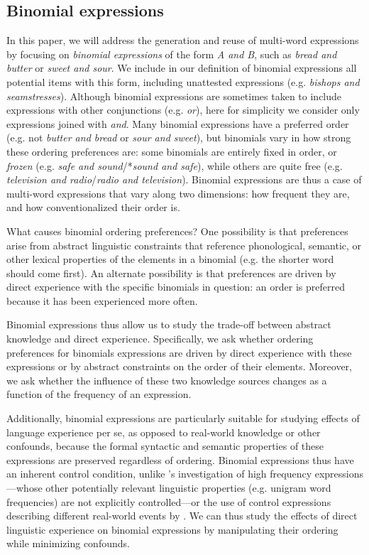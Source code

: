 \documentclass[authoryear]{elsarticle}
\begin{document}
\subsection{Binomial expressions}
In this paper, we will address the generation and reuse of multi-word expressions by focusing on \emph{binomial expressions} of the form \emph{A and B}, such as \emph{bread and butter} or \emph{sweet and sour}. We include in our definition of binomial expressions all potential items with this form, including unattested expressions (e.g. \emph{bishops and seamstresses}). Although binomial expressions are sometimes taken to include expressions with other conjunctions (e.g. \emph{or}), here for simplicity we consider only expressions joined with \emph{and}. Many binomial expressions have a preferred order (e.g. not \emph{butter and bread} or \emph{sour and sweet}), but binomials vary in how strong these ordering preferences are: some binomials are entirely fixed in order, or \emph{frozen} (e.g. \emph{safe and sound}/*\emph{sound and safe}), while others are quite free (e.g. \emph{television and radio}/\emph{radio and television}). Binomial expressions are thus a case of multi-word expressions that vary along two dimensions: how frequent they are, and how conventionalized their order is.

What causes binomial ordering preferences? One possibility is that preferences arise from abstract linguistic constraints that reference phonological, semantic, or other lexical properties of the elements in a binomial (e.g. the shorter word should come first). An alternate possibility is that preferences are driven by direct experience with the specific binomials in question: an order is preferred because it has been experienced more often.

Binomial expressions thus allow us to study the trade-off between abstract knowledge and direct experience. Specifically, we ask whether ordering preferences for binomials expressions are driven by direct experience with these expressions or by abstract constraints on the order of their elements. Moreover, we ask whether the influence of these two knowledge sources changes as a function of the frequency of an expression.

Additionally, binomial expressions are particularly suitable for studying effects of language experience per se, as opposed to real-world knowledge or other confounds, because the formal syntactic and semantic properties of these expressions are preserved regardless of ordering. Binomial expressions thus have an inherent control condition, unlike \citeauthor{Bybee:2006ul}'s \citeyearpar{Bybee:2006ul} investigation of high frequency expressions---whose other potentially relevant linguistic properties (e.g. unigram word frequencies) are not explicitly controlled---or the use of control expressions describing different real-world events by \citet[][e.g.,\ \emph{Don't have to worry} vs.\ \emph{Don't have to wait}]{Arnon:2010hz}. We can thus study the effects of direct linguistic experience on binomial expressions by manipulating their ordering while minimizing confounds.
\end{document}
